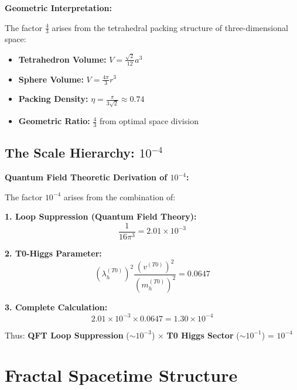 \documentclass[12pt,a4paper]{article}
\begin{document}
	\begin{alternative}
		\textbf{Geometric Interpretation:}
		
		The factor $\frac{4}{3}$ arises from the tetrahedral packing structure of three-dimensional space:
		\begin{itemize}
			\item \textbf{Tetrahedron Volume:} $V = \frac{\sqrt{2}}{12}a^3$
			\item \textbf{Sphere Volume:} $V = \frac{4\pi}{3}r^3$ 
			\item \textbf{Packing Density:} $\eta = \frac{\pi}{3\sqrt{2}} \approx 0.74$
			\item \textbf{Geometric Ratio:} $\frac{4}{3}$ from optimal space division
		\end{itemize}
	\end{alternative}
	
	\subsection{The Scale Hierarchy: $10^{-4}$}
	
	\begin{foundation}
		\textbf{Quantum Field Theoretic Derivation of $10^{-4}$:}
		
		The factor $10^{-4}$ arises from the combination of:
		
		\textbf{1. Loop Suppression (Quantum Field Theory):}
		\begin{equation}
			\frac{1}{16\pi^3} = 2.01 \times 10^{-3}
		\end{equation}
		
		\textbf{2. T0-Higgs Parameter:}
		\begin{equation}
			(\lambda_h^{(T0)})^2 \frac{(v^{(T0)})^2}{(m_h^{(T0)})^2} = 0.0647
		\end{equation}
		
		\textbf{3. Complete Calculation:}
		\begin{equation}
			2.01 \times 10^{-3} \times 0.0647 = 1.30 \times 10^{-4}
		\end{equation}
		
		Thus: \textbf{QFT Loop Suppression} ($\sim 10^{-3}$) $\times$ \textbf{T0 Higgs Sector} ($\sim 10^{-1}$) = $10^{-4}$
	\end{foundation}
	
	\section{Fractal Spacetime Structure}
	
\end{document}
